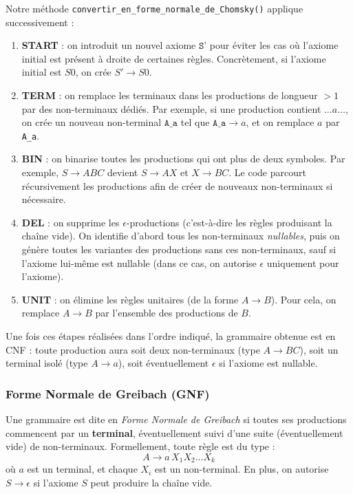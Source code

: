 \documentclass[a4paper,12pt]{article}
\begin{document}
Notre méthode \texttt{convertir\_en\_forme\_normale\_de\_Chomsky()} applique successivement :
\begin{enumerate}
    \item \textbf{START} : on introduit un nouvel axiome \(\texttt{S'}\) pour éviter les cas où l’axiome initial est présent à droite de certaines règles. Concrètement, si l’axiome initial est \(S0\), on crée \(S' \to S0\).  
    \item \textbf{TERM} : on remplace les terminaux dans les productions de longueur \(> 1\) par des non-terminaux dédiés. Par exemple, si une production contient \(\ldots a \ldots\), on crée un nouveau non-terminal \(\texttt{A\_a}\) tel que \(\texttt{A\_a} \to a\), et on remplace \(a\) par \texttt{A\_a}.  
    \item \textbf{BIN} : on binarise toutes les productions qui ont plus de deux symboles. Par exemple, \(S \to A B C\) devient \(S \to A X\) et \(X \to B C\). Le code parcourt récursivement les productions afin de créer de nouveaux non-terminaux si nécessaire.  
    \item \textbf{DEL} : on supprime les \(\epsilon\)-productions (c’est-à-dire les règles produisant la chaîne vide). On identifie d’abord tous les non-terminaux \emph{nullables}, puis on génère toutes les variantes des productions sans ces non-terminaux, sauf si l’axiome lui-même est nullable (dans ce cas, on autorise \(\epsilon\) uniquement pour l’axiome).  
    \item \textbf{UNIT} : on élimine les règles unitaires (de la forme \(A \to B\)). Pour cela, on remplace \(A \to B\) par l’ensemble des productions de \(B\).  
\end{enumerate}

Une fois ces étapes réalisées dans l’ordre indiqué, la grammaire obtenue est en CNF : toute production aura soit deux non-terminaux (type \(A \to BC\)), soit un terminal isolé (type \(A \to a\)), soit éventuellement \(\epsilon\) si l’axiome est nullable.

\subsubsection{Forme Normale de Greibach (GNF)}

Une grammaire est dite en \emph{Forme Normale de Greibach} si toutes ses productions commencent par un \textbf{terminal}, éventuellement suivi d’une suite (éventuellement vide) de non-terminaux. Formellement, toute règle est du type :
\[
A \to a \, X_1 X_2 \ldots X_k
\]
où \(a\) est un terminal, et chaque \(X_i\) est un non-terminal. En plus, on autorise \(S \to \epsilon\) si l’axiome \(S\) peut produire la chaîne vide.
\end{document}

